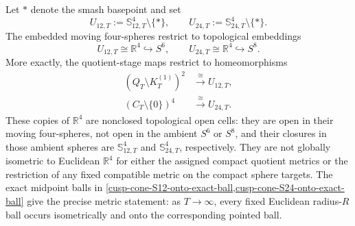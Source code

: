 \begin{corollary}
\label{cusp-cone-literal-R4-open-cells}
Let \(*\) denote the smash basepoint and set
\[
 U_{12,T}:=\mathbb S_{12,T}^4\setminus\{*\},
 \qquad
 U_{24,T}:=\mathbb S_{24,T}^4\setminus\{*\}.
\]
The embedded moving four-spheres restrict to topological embeddings
\[
 U_{12,T}\cong\mathbb R^4\hookrightarrow S^6,
 \qquad
 U_{24,T}\cong\mathbb R^4\hookrightarrow S^8.
\]
More exactly, the quotient-stage maps restrict to homeomorphisms
\begin{align}
 (Q_T\setminus K_T^{(1)})^2
 &\xrightarrow{\ \cong\ }U_{12,T},
 \label{cusp-cone-U12-homeomorphism}\\
 (C_T\setminus\{0\})^4
 &\xrightarrow{\ \cong\ }U_{24,T}.
 \label{cusp-cone-U24-homeomorphism}
\end{align}
These copies of \(\mathbb R^4\) are nonclosed topological open cells: they
are open in their moving four-spheres, not open in the ambient \(S^6\) or
\(S^8\), and their closures in those ambient spheres are
\(\mathbb S_{12,T}^4\) and \(\mathbb S_{24,T}^4\), respectively.  They are
not globally isometric to Euclidean \(\mathbb R^4\) for either the assigned
compact quotient metrics or the restriction of any fixed compatible metric
on the compact sphere targets.  The exact midpoint balls in
\cref{cusp-cone-S12-onto-exact-ball,cusp-cone-S24-onto-exact-ball} give the
precise metric statement: as \(T\to\infty\), every fixed Euclidean
radius-\(R\) ball occurs isometrically and onto the corresponding pointed
ball.
\end{corollary}

